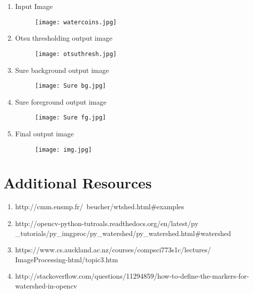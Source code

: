 \documentclass[]{article}
\providecommand{\tightlist}{%
  \setlength{\itemsep}{0pt}\setlength{\parskip}{0pt}}
\begin{document}
\begin{enumerate}
\def\labelenumi{\arabic{enumi})}
\item Input Image\\
   \begin{figure}[h]
   	\texttt{[image: watercoins.jpg]}
   \end{figure}
\newpage
\item Otsu thresholding output image\\
\begin{figure}[h]
	\texttt{[image: otsuthresh.jpg]}
\end{figure}
\newpage
\item Sure background output image\\
  \begin{figure}[h]
  	\texttt{[image: Sure bg.jpg]}
  \end{figure}
\newpage
\item Sure foreground output image\\
  \begin{figure}[h]
	\texttt{[image: Sure fg.jpg]}
  \end{figure}

\newpage   
\item
  Final output image\\
  \begin{figure}[h]
  	\texttt{[image: img.jpg]}
  \end{figure}
  
\end{enumerate}
\newpage
\section{Additional Resources}\label{additional-resources}

\begin{enumerate}
\def\labelenumi{\arabic{enumi})}
\tightlist
\item http://cmm.ensmp.fr/~beucher/wtshed.html\#examples
\item http://opencv-python-tutroals.readthedocs.org/en/latest/py
\_tutorials/py\_imgproc/py\_watershed/py\_watershed.html\#watershed
\item https://www.cs.auckland.ac.nz/courses/compsci773s1c/lectures/
ImageProcessing-html/topic3.htm
\item http://stackoverflow.com/questions/11294859/how-to-define-the-markers-for-watershed-in-opencv
\end{enumerate}
\end{document}
